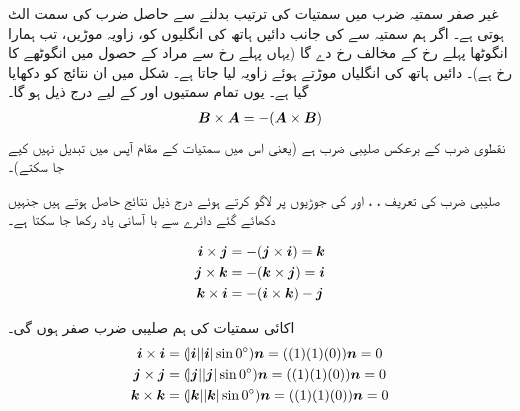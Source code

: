 غیر صفر سمتیہ ضرب میں سمتیات کی ترتیب بدلنے سے حاصل ضرب کی سمت الٹ ہوتی ہے۔ اگر ہم سمتیہ  سے  کی جانب دائیں ہاتھ کی انگلیوں کو، زاویہ   موڑیں، تب ہمارا انگوٹھا پہلے رخ کے مخالف رخ دے گا (یہاں پہلے رخ سے مراد  کے حصول میں انگوٹھے کا رخ ہے)۔ دائیں ہاتھ کی انگلیاں موڑتے ہوئے زاویہ  لیا جاتا ہے۔  شکل  میں ان نتائج کو دکھایا گیا ہے۔ یوں تمام سمتیوں   اور  کے لیے درج ذیل ہو گا۔
\begin{align}
{\ensuremath{{\boldsymbol{B}}}}\times{\ensuremath{{\boldsymbol{A}}}}=-({{\boldsymbol{A}}}\times{\ensuremath{{\boldsymbol{B}}}})
\end{align}
نقطوی ضرب کے برعکس صلیبی ضرب  ہے (یعنی اس میں سمتیات کے مقام آپس میں تبدیل نہیں کیے جا سکتے)۔

صلیبی ضرب کی تعریف ، ،  اور  کی جوڑیوں پر لاگو کرتے ہوئے درج ذیل نتائج حاصل ہوتے ہیں جنہیں دکھائے گئے دائرے سے با آسانی یاد رکھا جا سکتا ہے۔

\begin{minipage}{0.25\textwidth}
\centering
{}
\end{minipage}\hfill
\begin{minipage}{0.65\textwidth}
\centering
\begin{gather}
\begin{aligned}
{\boldsymbol{i}}\times{\boldsymbol{j}}&=-({\boldsymbol{j}}\times{\boldsymbol{i}})={\boldsymbol{k}}\\
{\boldsymbol{j}}\times{\boldsymbol{k}}&=-({\boldsymbol{k}}\times{\boldsymbol{j}})={\boldsymbol{i}}\\
{\boldsymbol{k}}\times{\boldsymbol{i}}&=-({\boldsymbol{i}}\times{\boldsymbol{k}})-{\boldsymbol{j}}
\end{aligned}
\end{gather}
\end{minipage}

اکائی سمتیات کی  ہم صلیبی ضرب صفر ہوں گی۔
\begin{align*}
{\ensuremath{{\boldsymbol{{\boldsymbol{i}}}}}}\times{\ensuremath{{\boldsymbol{i}}}}&=(\abs{{\boldsymbol{i}}}\abs{{\boldsymbol{i}}}\sin0^{\circ}){{\boldsymbol{n}}}=((1)(1)(0)){{\boldsymbol{n}}}=0\\
{{\boldsymbol{{\boldsymbol{j}}}}}\times{\ensuremath{{\boldsymbol{{\boldsymbol{j}}}}}}&=(\abs{{\boldsymbol{j}}}\abs{{\boldsymbol{j}}}\sin0^{\circ}){{\boldsymbol{n}}}=((1)(1)(0)){{\boldsymbol{n}}}=0\\
{{\boldsymbol{{\boldsymbol{k}}}}}\times{\ensuremath{{\boldsymbol{{\boldsymbol{k}}}}}}&=(\abs{{\boldsymbol{k}}}\abs{{\boldsymbol{k}}}\sin0^{\circ}){{\boldsymbol{n}}}=((1)(1)(0)){{\boldsymbol{n}}}=0
\end{align*}

